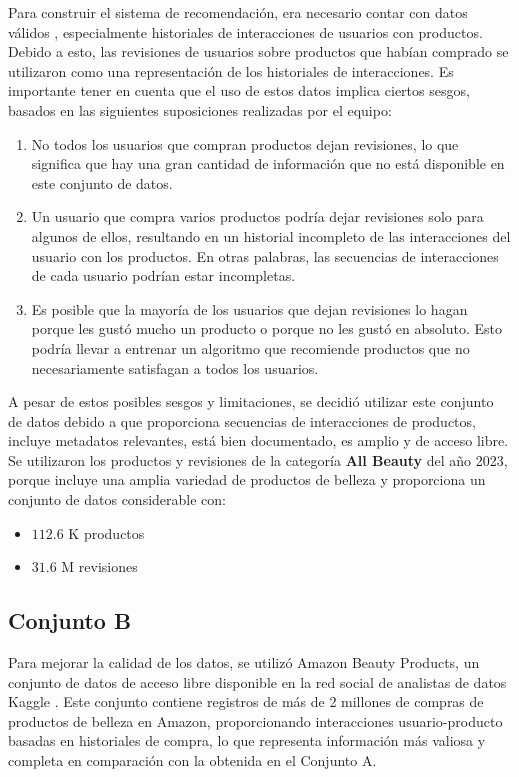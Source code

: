 \documentclass[runningheads]{llncs}
\begin{document}
Para construir el sistema de recomendación, era necesario contar con datos válidos , especialmente historiales de interacciones de usuarios con productos. Debido a esto, las revisiones de usuarios sobre productos que habían comprado se utilizaron como una representación de los historiales de interacciones. Es importante tener en cuenta que el uso de estos datos implica ciertos sesgos, basados en las siguientes suposiciones realizadas por el equipo:
\begin{enumerate}
	\item No todos los usuarios que compran productos dejan revisiones, lo que significa que hay una gran cantidad de información que no está disponible en este conjunto de datos.
	\item Un usuario que compra varios productos podría dejar revisiones solo para algunos de ellos, resultando en un historial incompleto de las interacciones del usuario con los productos. En otras palabras, las secuencias de interacciones de cada usuario podrían estar incompletas.
	\item Es posible que la mayoría de los usuarios que dejan revisiones lo hagan porque les gustó mucho un producto o porque no les gustó en absoluto. Esto podría llevar a entrenar un algoritmo que recomiende productos que no necesariamente satisfagan a todos los usuarios.
\end{enumerate}

A pesar de estos posibles sesgos y limitaciones, se decidió utilizar este conjunto de datos debido a que proporciona secuencias de interacciones de productos, incluye metadatos relevantes, está bien documentado, es amplio y de acceso libre. Se utilizaron los productos y revisiones de la categoría \textbf{All Beauty} del año 2023, porque incluye una amplia variedad de productos de belleza y proporciona un conjunto de datos considerable con:
\begin{itemize}
	\item $112.6$ K productos
	\item $31.6$ M revisiones
\end{itemize}

\subsection{Conjunto B}

Para mejorar la calidad de los datos, se utilizó Amazon Beauty Products, un conjunto de datos de acceso libre disponible en la red social de analistas de datos Kaggle \cite{satrap_2021}. Este conjunto contiene registros de más de 2 millones de compras de productos de belleza en Amazon, proporcionando interacciones usuario-producto basadas en historiales de compra, lo que representa información más valiosa y completa en comparación con la obtenida en el Conjunto A.
\end{document}
